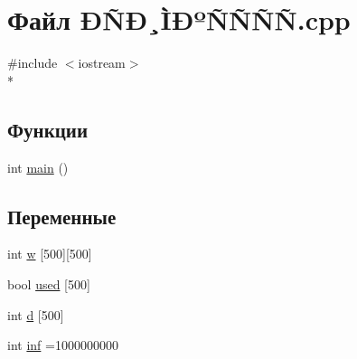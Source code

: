 \hypertarget{_xC3_x90_xC2_x94_xC3_x91_xC2_x8D_xC3_x90_xC2_xB8_xC3_x8C_xC2_x86_xC3_x90_xC2_xBA_xC3_x91_xC2_x8182fc0d8b98cfa0d55117006b855a03a3}{\section{Файл ÐÑÐ¸ÌÐºÑÑÑÑ.\-cpp}
\label{_xC3_x90_xC2_x94_xC3_x91_xC2_x8D_xC3_x90_xC2_xB8_xC3_x8C_xC2_x86_xC3_x90_xC2_xBA_xC3_x91_xC2_x8182fc0d8b98cfa0d55117006b855a03a3}
}
{\ttfamily \#include $<$iostream$>$}\\*
\subsection*{Функции}
\begin{DoxyCompactItemize}
\item 
int \hyperlink{_xC3_x90_xC2_x94_xC3_x91_xC2_x8D_xC3_x90_xC2_xB8_xC3_x8C_xC2_x86_xC3_x90_xC2_xBA_xC3_x91_xC2_x8182fc0d8b98cfa0d55117006b855a03a3_ae66f6b31b5ad750f1fe042a706a4e3d4}{main} ()
\end{DoxyCompactItemize}
\subsection*{Переменные}
\begin{DoxyCompactItemize}
\item 
int \hyperlink{_xC3_x90_xC2_x94_xC3_x91_xC2_x8D_xC3_x90_xC2_xB8_xC3_x8C_xC2_x86_xC3_x90_xC2_xBA_xC3_x91_xC2_x8182fc0d8b98cfa0d55117006b855a03a3_aa5de3ae229feb0d717caa2cac8616683}{w} \mbox{[}500\mbox{]}\mbox{[}500\mbox{]}
\item 
bool \hyperlink{_xC3_x90_xC2_x94_xC3_x91_xC2_x8D_xC3_x90_xC2_xB8_xC3_x8C_xC2_x86_xC3_x90_xC2_xBA_xC3_x91_xC2_x8182fc0d8b98cfa0d55117006b855a03a3_a31374cf158aa8bf8e942d2e735f40b95}{used} \mbox{[}500\mbox{]}
\item 
int \hyperlink{_xC3_x90_xC2_x94_xC3_x91_xC2_x8D_xC3_x90_xC2_xB8_xC3_x8C_xC2_x86_xC3_x90_xC2_xBA_xC3_x91_xC2_x8182fc0d8b98cfa0d55117006b855a03a3_a91706a72736c438c5dde63833c6184ab}{d} \mbox{[}500\mbox{]}
\item 
int \hyperlink{_xC3_x90_xC2_x94_xC3_x91_xC2_x8D_xC3_x90_xC2_xB8_xC3_x8C_xC2_x86_xC3_x90_xC2_xBA_xC3_x91_xC2_x8182fc0d8b98cfa0d55117006b855a03a3_a0726229cd75e3b3be1d6e3c8fccacb87}{inf} =1000000000
\end{DoxyCompactItemize}


